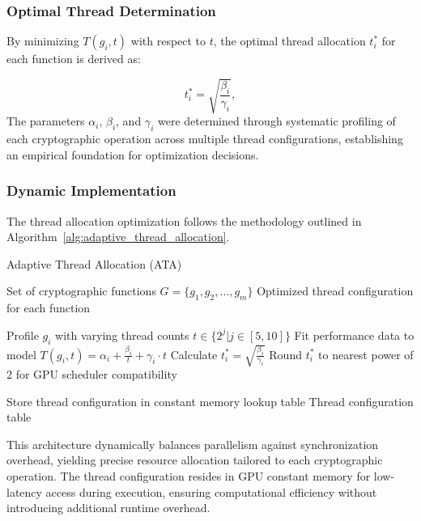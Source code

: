 \documentclass[journal]{IEEEtran}
\begin{document}
\subsubsection{Optimal Thread Determination}

By minimizing $T(g_i, t)$ with respect to $t$, the optimal thread allocation $t_i^*$ for each function is derived as:

\begin{equation}
  \label{eq:optimal_thread_count}
  t_i^* = \sqrt{\frac{\beta_i}{\gamma_i}},
\end{equation}
The parameters $\alpha_i$, $\beta_i$, and $\gamma_i$ were determined through systematic profiling of each cryptographic operation across multiple thread configurations, establishing an empirical foundation for optimization decisions.

\subsubsection{Dynamic Implementation}

The thread allocation optimization follows the methodology outlined in Algorithm~\ref{alg:adaptive_thread_allocation}.

\begin{algorithm}
  \caption{Adaptive Thread Allocation (ATA)}
  \label{alg:adaptive_thread_allocation}
  \begin{algorithmic}[1]
    \REQUIRE Set of cryptographic functions $G = \{g_1, g_2, \ldots, g_m\}$
    \ENSURE Optimized thread configuration for each function

    \STATE Profile $g_i$ with varying thread counts $t \in \{2^j | j \in [5, 10]\}$
    \STATE Fit performance data to model $T(g_i, t) = \alpha_i + \frac{\beta_i}{t} + \gamma_i \cdot t$
    \STATE Calculate $t_i^* = \sqrt{\frac{\beta_i}{\gamma_i}}$
    \STATE Round $t_i^*$ to nearest power of 2 for GPU scheduler compatibility
    \ENDFOR

    \STATE Store thread configuration in constant memory lookup table
    \RETURN Thread configuration table
  \end{algorithmic}
\end{algorithm}

This architecture dynamically balances parallelism against synchronization overhead, yielding precise resource allocation tailored to each cryptographic operation. The thread configuration resides in GPU constant memory for low-latency access during execution, ensuring computational efficiency without introducing additional runtime overhead.
\end{document}
